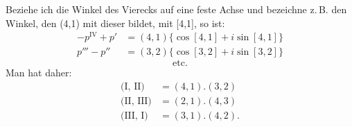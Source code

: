 Beziehe ich die Winkel des Vierecks auf eine feste Achse und bezeichne z.\,B. den Winkel, den (4,1)
mit dieser bildet, mit [4,1], so ist:
\[
\begin{array}{rl}
-p^{\mathrm{IV}} + p' & = (4,1)\{\cos[4,1] + i\sin[4,1]\} \\
p''' - p'' & = (3,2)\{\cos[3,2] + i\sin[3,2]\}
\end{array}
\]
\[
\text{etc.}
\]
Man hat daher:
\[
\begin{array}{rl}
\text{(I, II)} & = (4,1) . (3,2) \\
\text{(II, III)} & = (2,1) . (4,3) \\
\text{(III, I)} & = (3,1) . (4,2).
\end{array}
\]
